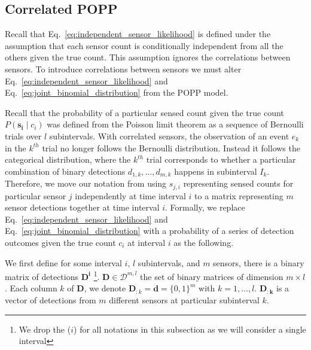 
\subsection{Correlated POPP}
\label{subsec:cpop}

Recall that Eq.~\ref{eq:independent_sensor_likelihood} is defined under the assumption that each sensor count is conditionally independent from all the others given the true count. This assumption ignores the correlations between sensors. To introduce correlations between sensors we must alter Eq.~\ref{eq:independent_sensor_likelihood} and
Eq.~\ref{eq:joint_binomial_distribution} from the POPP model.

Recall that the probability of a particular sensed count given the true count $P(\mathbf{s_i} \mid c_i)$ was defined from the Poisson limit theorem as a sequence of Bernoulli trials over $l$ subintervals. With correlated sensors, the observation of an event $e_k$ in the $k^{th}$ trial no longer follows the Bernoulli distribution. Instead it follows the categorical distribution, where the $k^{th}$ trial corresponds to whether a particular combination of binary detections $d_{1,k}, \ldots, d_{m,k}$ happens in subinterval $I_k$. Therefore, we move our notation from using $s_{j, i}$ representing sensed counts for particular sensor $j$ independently at time interval $i$ to a matrix representing $m$ sensor detections together at time interval $i$. Formally, we replace Eq.~\ref{eq:independent_sensor_likelihood} and Eq.~\ref{eq:joint_binomial_distribution} with a probability of a series of detection outcomes given the true count $c_i$ at interval $i$ as the following.

We first define for some interval $i$, $l$ subintervals, and $m$ sensors, there is a binary matrix of detections $\mathbf{D^i}$ \footnote{We drop the ($i$) for all notations in this subsection as we will consider a single interval}. $\mathbf{D} \in \mathcal{D}^{m , l}$ the set of binary matrices of dimension $m \times l$. Each column $k$ of $\mathbf{D}$, we denote $\mathbf{D}_{:k} = \mathbf{d} = \{0, 1\}^m$ with $k = 1, \ldots, l$. $\mathbf{D_{:k}}$ is a vector of detections from $m$ different sensors at particular subinterval $k$. 


